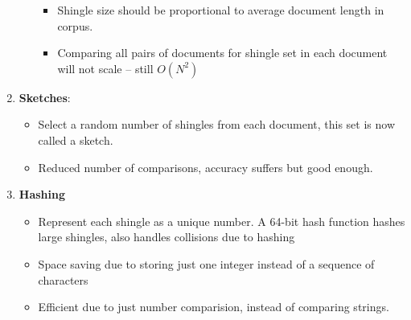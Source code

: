 \documentclass{article}
\begin{document}
\begin{enumerate}
\begin{itemize}
\begin{itemize}
            \item Shingle size should be proportional to average document length in corpus. 
            
            \item Comparing all pairs of documents for shingle set in each document will not scale – still $O(N^2)$
        \end{itemize}
    \end{itemize}
    
    \item \textbf{Sketches}:
    \begin{itemize}
        \item Select a random number of shingles from each document, this set is now called a sketch. 
        
        \item Reduced number of comparisons, accuracy suffers but good enough. 
    \end{itemize}
    
    \item \textbf{Hashing}
    \begin{itemize}
        \item Represent each shingle as a unique number. A 64-bit hash function hashes large shingles, also handles collisions due to hashing
        
        \item Space saving due to storing just one integer instead of a sequence of characters
        
        \item Efficient due to just number comparision, instead of comparing strings. 
    \end{itemize}
\end{enumerate}
\end{document}
